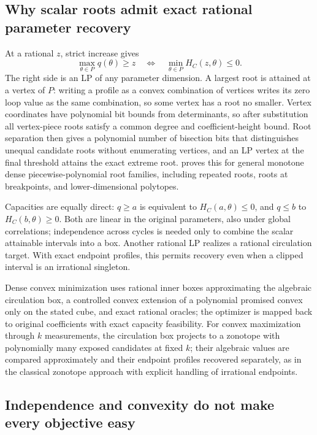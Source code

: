 \subsection{Why scalar roots admit exact rational parameter recovery}

At a rational $z$, strict increase gives
\[
 \max_{\theta\in P}q(\theta)\ge z
 \quad\Longleftrightarrow\quad
 \min_{\theta\in P}H_C(z,\theta)\le0.
\]
The right side is an LP of any parameter dimension. A largest root is
attained at a vertex of $P$: writing a profile as a convex combination
of vertices writes its zero loop value as the same combination, so some
vertex has a root no smaller. Vertex coordinates have polynomial bit
bounds from determinants, so after substitution all vertex-piece roots
satisfy a common degree and coefficient-height bound. Root separation
then gives a polynomial number of bisection bits that distinguishes
unequal candidate roots without enumerating vertices, and an LP vertex
at the final threshold attains the exact extreme root.
 proves this for general monotone dense
piecewise-polynomial root families, including repeated roots, roots at
breakpoints, and lower-dimensional polytopes.

Capacities are equally direct: $q\ge a$ is equivalent to
$H_C(a,\theta)\le0$, and $q\le b$ to $H_C(b,\theta)\ge0$. Both are
linear in the original parameters, also under global correlations;
independence across cycles is needed only to combine the scalar
attainable intervals into a box. Another rational LP realizes a rational
circulation target. With exact endpoint profiles, this permits recovery
even when a clipped interval is an irrational singleton.

Dense convex minimization uses rational inner boxes approximating the
algebraic circulation box, a controlled convex extension of a polynomial
promised convex only on the stated cube, and exact rational oracles;
the optimizer is mapped back to original coefficients with exact
capacity feasibility. For convex maximization through $k$ measurements,
the circulation box projects to a zonotope with polynomially many
exposed candidates at fixed $k$; their algebraic values are compared
approximately and their endpoint profiles recovered separately, as in
the classical zonotope approach with explicit handling of irrational
endpoints.

\subsection{Independence and convexity do not make every objective easy}

